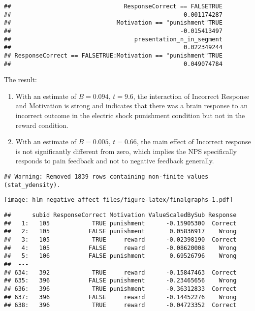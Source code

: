 \documentclass[]{article}
\providecommand{\tightlist}{%
  \setlength{\itemsep}{0pt}\setlength{\parskip}{0pt}}
\begin{document}
\begin{verbatim}
##                                ResponseCorrect == FALSETRUE 
##                                                -0.001174287 
##                              Motivation == "punishment"TRUE 
##                                                -0.015413497 
##                                   presentation_n_in_segment 
##                                                 0.022349244 
## ResponseCorrect == FALSETRUE:Motivation == "punishment"TRUE 
##                                                 0.049074784
\end{verbatim}

The result:

\begin{enumerate}
\def\labelenumi{\arabic{enumi}.}
\tightlist
\item
  With an estimate of \(B=0.094\), \(t=9.6\), the interaction of
  Incorrect Response and Motivation is strong and indicates that there
  was a brain response to an incorrect outcome in the electric shock
  punishment condition but not in the reward condition.
\item
  With an estimate of \(B=0.005\), \(t=0.66\), the main effect of
  Incorrect response is not significantly different from zero, which
  implies the NPS specifically responds to pain feedback and not to
  negative feedback generally.
\end{enumerate}

\begin{verbatim}
## Warning: Removed 1839 rows containing non-finite values (stat_ydensity).
\end{verbatim}

\texttt{[image: hlm\_negative\_affect\_files/figure-latex/finalgraphs-1.pdf]}

\begin{verbatim}
##      subid ResponseCorrect Motivation ValueScaledBySub Response
##   1:   105            TRUE punishment      -0.15905300  Correct
##   2:   105           FALSE punishment       0.05836917    Wrong
##   3:   105            TRUE     reward      -0.02398190  Correct
##   4:   105           FALSE     reward      -0.08620008    Wrong
##   5:   106           FALSE punishment       0.69526796    Wrong
##  ---                                                           
## 634:   392            TRUE     reward      -0.15847463  Correct
## 635:   396           FALSE punishment      -0.23465656    Wrong
## 636:   396            TRUE punishment      -0.36312833  Correct
## 637:   396           FALSE     reward      -0.14452276    Wrong
## 638:   396            TRUE     reward      -0.04723352  Correct
\end{verbatim}
\end{document}
